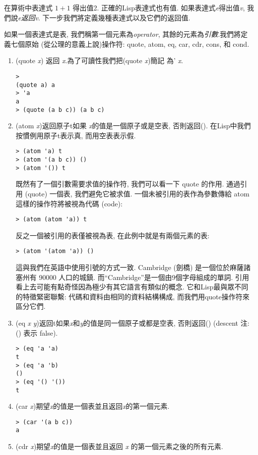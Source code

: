 \documentclass[12pt]{article}
\begin{document}
\begin{CJK}{UTF8}{bsmi}
在算術中表達式 $1 + 1$ 得出值2. 
正確的Lisp表達式也有值. 
如果表達式{\it e}得出值{\it v}, 我們說{\it e}{\em 返回}{\it v}. 
下一步我們將定義幾種表達式以及它們的返回值. 

如果一個表達式是表, 我們稱第一個元素為{\em operator}, 其餘的元素為{\em 引數}.我們將定義七個原始
(從公理的意義上說)操作符: 
quote, atom, eq, car, cdr, cons, 和 cond. 

\begin{enumerate} 
\item 
(quote 
{\it 
x}) 
返回{\it 
x}.為了可讀性我們把(quote 
{\it 
x})簡記 
為'{\it 
x}. 

\begin{verbatim} 
> 
(quote a) a 
> 'a 
a 
> (quote (a b c)) (a b c) 
\end{verbatim} 
\item 
(atom 
{\it 
x})返回原子t如果{\it 
x}的值是一個原子或是空表, 否則返回(). 
在Lisp中我們 
按慣例用原子t表示真, 
而用空表表示假. 
\begin{verbatim} 
> (atom 'a) t 
> (atom '(a b c)) () 
> (atom '()) t 
\end{verbatim} 
既然有了一個引數需要求值的操作符, 
我們可以看一下 quote 的作用. 
通過引用 (quote) 一個表, 我們避免它被求值. 
一個未被引用的表作為參數傳給 atom 這樣的操作符將被視為代碼 (code): 
\begin{verbatim} 
> (atom (atom 'a)) t 
\end{verbatim} 
反之一個被引用的表僅被視為表, 
在此例中就是有兩個元素的表: 
\begin{verbatim} 
> (atom '(atom 'a)) () 
\end{verbatim} 
這與我們在英語中使用引號的方式一致. 
{\rm Cambridge} (劍橋) 是一個位於麻薩諸塞州有 90000 人口的城鎮. 
而``{\rm Cambridge}''是一個由9個字母組成的單詞. 
引用看上去可能有點奇怪因為極少有其它語言有類似的概念. 
它和Lisp最與眾不同的特徵緊密聯繫: 代碼和資料由相同的資料結構構成, 
而我們用quote操作符來區分它們. 
\item 
(eq {\it x} {\it y})返回t如果{\it x}和{\it y}的值是同一個原子或都是空表, 否則返回() (descent 注: () 表示 false). 
\begin{verbatim} 
> (eq 'a 'a) 
t 
> (eq 'a 'b) 
() 
> (eq '() '()) 
t 
\end{verbatim} 
\item 
(car {\it x})期望{\it x}的值是一個表並且返回{\it x}的第一個元素. 
\begin{verbatim} 
> (car '(a b c)) 
a 
\end{verbatim} 
\item 
(cdr {\it x})期望{\it x}的值是一個表並且返回 {\it x} 的第一個元素之後的所有元素. 

\end{enumerate}
\end{CJK}
\end{document}
